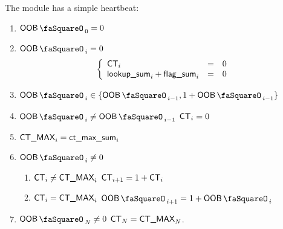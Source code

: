 The \oobMod{} module has a simple heartbeat:
\begin{enumerate}
	\item $\oobStamp_{0} = 0$
	\item \If $\oobStamp_{i} = 0$ \Then
		\[
			\left\{ \begin{array}{lcl}
				\textsf{CT}_{i}                          & = & 0 \\
				\textsf{lookup\_sum}_{i} + \textsf{flag\_sum}_{i} & = & 0 \\
			\end{array} \right.
		\] 
	\item $\oobStamp_{i} \in \{ \oobStamp_{i - 1}, 1 + \oobStamp_{i - 1} \}$
	\item \If $\oobStamp_{i} \neq \oobStamp_{i - 1}$ \Then $\textsf{CT}_{i} = 0$
	\item $\textsf{CT\_MAX}_{i} = \textsf{ct\_max\_sum}_{i}$
	\item \If $\oobStamp_{i} \neq 0$ \Then
		\begin{enumerate}
			\item \If $\textsf{CT}_{i} \neq \textsf{CT\_MAX}_{i}$ \Then $\textsf{CT}_{i + 1} = 1 + \textsf{CT}_{i}$
			\item \If $\textsf{CT}_{i} =    \textsf{CT\_MAX}_{i}$ \Then $\oobStamp_{i + 1} = 1 + \oobStamp_{i}$
		\end{enumerate}
	\item \If $\oobStamp_{N} \neq 0$ \Then $\textsf{CT}_{N} = \textsf{CT\_MAX}_{N}$.
\end{enumerate}
